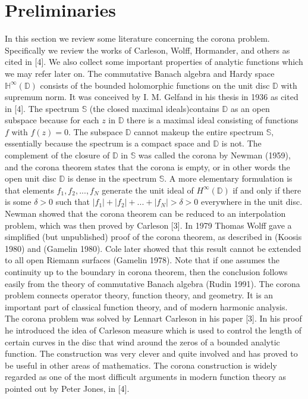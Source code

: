 \documentclass[reqno, 12pt]{amsart}
\theoremstyle{definition}
\theoremstyle{definition}
\begin{document}

\section{Preliminaries}
In this section we review some literature concerning the corona problem. Specifically we review the works of Carleson, Wolff, Hormander, and others as cited in [4]. We also collect some important properties of analytic functions which we may refer later on. 
The commutative Banach algebra and Hardy space $\mathbb{H}^\infty(\mathbb{D})$ consists of the bounded holomorphic functions on the unit disc $\mathbb{D}$ with supremum norm. It was conceived by I. M. Gelfand in his thesis in 1936 as cited in [4]. The spectrum $\mathbb{S}$ (the closed maximal ideals)contains $\mathbb{D}$ as an open subspace because for each $z$ in $\mathbb{D}$ there is a maximal ideal consisting of functions $f$ with $f(z)=0$. The subspace $\mathbb{D}$ cannot makeup the entire spectrum $\mathbb{S},$ essentially because the spectrum is a compact space and $\mathbb{D}$ is not. The complement of the closure of $\mathbb{D}$ in $\mathbb{S}$ was called the corona by Newman (1959), and the corona theorem states that the corona is empty, or in other words the open unit disc $\mathbb{D}$ is dense in the spectrum $\mathbb{S}.$ A more elementary formulation is that elements $f_1, f_2, ..., f_N$ generate the unit ideal of $H^\infty(\mathbb{D})$ if and only if there is some $\delta > 0$ such that $\lvert f_1 \rvert+ \lvert f_2 \rvert +...+ \lvert f_N \rvert > \delta > 0$ everywhere in the unit disc. Newman showed that the corona theorem can be reduced to an interpolation problem, which was then proved by Carleson [3]. In 1979 Thomas Wolff gave a simplified (but unpublished) proof of the corona theorem, as described in (Koosis 1980) and (Gamelin 1980). Cole later showed that this result cannot be extended to all open Riemann surfaces (Gamelin 1978).  Note that if one assumes the continuity up to the boundary in corona theorem, then the conclusion follows easily from the theory of commutative Banach algebra (Rudin 1991). 
The corona problem connects operator theory, function theory, and geometry. It is an important part of classical function theory, and of modern harmonic analysis. The corona problem was solved by Lennart Carleson in his paper [3]. In his proof he introduced the idea of Carleson measure which is used to control the length of certain curves in the disc that wind around the zeros of a bounded analytic function. The construction was very clever and quite involved and has proved to be useful in other areas of mathematics. The corona construction is widely regarded as one of the most difficult arguments in modern function theory as pointed out by Peter Jones, in [4].
\end{document}
